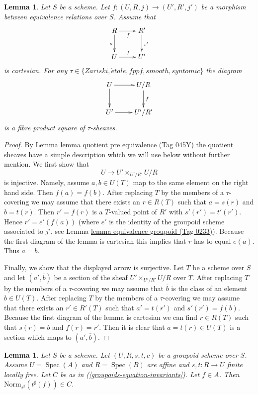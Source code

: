 \documentclass{amsart}
\theoremstyle{plain}
\newtheorem{lemma}[subsection]{Lemma}
\theoremstyle{definition}
\theoremstyle{remark}
\numberwithin{equation}{subsection}
\def\Spec{\mathop{\mathrm{Spec}}}
\def\etale{{\acute{e}tale}}
\begin{document}
\begin{lemma}
\label{groupoids-lemma-criterion-fibre-product}
Let $S$ be a scheme. Let $f : (U, R, j) \to (U', R', j')$ be a morphism
between equivalence relations over $S$. Assume that
$$
\xymatrix{
R \ar[d]_s \ar[r]_f & R' \ar[d]^{s'} \\
U \ar[r]^f & U'
}
$$
is cartesian. For any
$\tau \in  \{Zariski, \etale, fppf, smooth, syntomic\}$
the diagram
$$
\xymatrix{
U \ar[d] \ar[r] & U/R \ar[d]^f \\
U' \ar[r] & U'/R'
}
$$
is a fibre product square of $\tau$-sheaves.
\end{lemma}

\begin{proof}
By Lemma \href{https://stacks.math.columbia.edu/tag/045Y}{lemma quotient pre equivalence (Tag 045Y)} the quotient sheaves
have a simple description which we will use below without further mention.
We first show that
$$
U \longrightarrow U' \times_{U'/R'} U/R
$$
is injective. Namely, assume $a, b \in U(T)$ map to the same element
on the right hand side. Then $f(a) = f(b)$. After replacing $T$ by the
members of a $\tau$-covering we may assume that there exists an
$r \in R(T)$ such that $a = s(r)$ and $b = t(r)$. Then $r' = f(r)$
is a $T$-valued point of $R'$ with $s'(r') = t'(r')$. Hence
$r' = e'(f(a))$ (where $e'$ is the identity of the groupoid
scheme associated to $j'$, see Lemma \href{https://stacks.math.columbia.edu/tag/0233}{lemma equivalence groupoid (Tag 0233)}).
Because the first diagram of the lemma is cartesian this implies
that $r$ has to equal $e(a)$. Thus $a = b$.

\medskip\noindent
Finally, we show that the displayed arrow is surjective. Let
$T$ be a scheme over $S$ and let $(a', \overline{b})$ be a section
of the sheaf $U' \times_{U'/R'} U/R$ over $T$. After replacing $T$
by the members of a $\tau$-covering we may assume that $\overline{b}$
is the class of an element $b \in U(T)$. After replacing $T$
by the members of a $\tau$-covering we may assume that there exists
an $r' \in R'(T)$ such that $a' = t(r')$ and $s'(r') = f(b)$.
Because the first diagram of the lemma is cartesian we can find
$r \in R(T)$ such that $s(r) = b$ and $f(r) = r'$. Then it is clear
that $a = t(r) \in U(T)$ is a section which maps to
$(a', \overline{b})$.
\end{proof}


\begin{lemma}
\label{groupoids-lemma-determinant-trick}
Let $S$ be a scheme. Let $(U, R, s, t, c)$ be a groupoid scheme over $S$.
Assume $U = \Spec(A)$ and $R = \Spec(B)$ are affine and
$s, t : R \to U$ finite locally free.
Let $C$ be as in (\ref{groupoids-equation-invariants}).
Let $f \in A$. Then $\text{Norm}_{s^\sharp}(t^\sharp(f)) \in C$.
\end{lemma}
\end{document}
